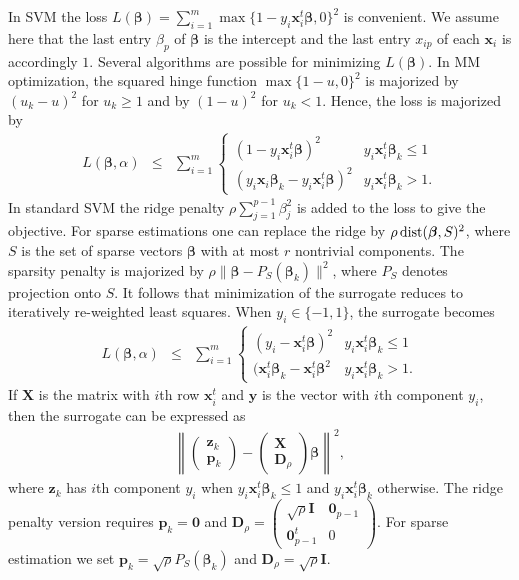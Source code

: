 \documentclass[11pt]{article}
\def\dist{\mathop{\rm dist}\nolimits}
\newcommand{\bzero}{\boldsymbol{0}}
\newcommand{\bp}{\boldsymbol{p}}
\newcommand{\bx}{\boldsymbol{x}}
\newcommand{\by}{\boldsymbol{y}}
\newcommand{\bz}{\boldsymbol{z}}
\newcommand{\bD}{\boldsymbol{D}}
\newcommand{\bI}{\boldsymbol{I}}
\newcommand{\bX}{\boldsymbol{X}}
\newcommand{\bbeta}{\boldsymbol{\beta}}
\begin{document}
In SVM the loss $L(\bbeta)=\sum_{i=1}^m \max\{1-y_i \bx_i^t\bbeta,0\}^2$ is convenient. We assume here that the last entry $\beta_p$ of $\bbeta$ is the intercept and the last entry $x_{ip}$ of each $\bx_i$ is accordingly $1$.  Several algorithms are possible for minimizing $L(\bbeta)$. In MM optimization, the squared hinge function $\max\{1-u,0\}^2$ is majorized by $(u_k-u)^2$ for $u_k \ge 1$ and by $(1-u)^2$ for $u_k < 1$. Hence, the loss is majorized by
\begin{eqnarray*}
L(\bbeta,\alpha) & \le & \sum_{i=1}^m
\begin{cases} (1-y_i \bx_i^t \bbeta)^2 & y_i \bx_i^t \bbeta_k \le 1 \\
(y_i \bx_i\bbeta_k - y_i \bx_i^t \bbeta)^2 & y_i \bx_i^t \bbeta_k > 1 .\end{cases}
\end{eqnarray*} 
In standard SVM the ridge penalty $\rho \sum_{j=1}^{p-1}\beta_j^2$ is added to the loss to give the objective. For sparse estimations one can replace the ridge by 
$\rho\dist(\bbeta,S)^2$, where $S$ is the set of sparse vectors $\bbeta$ with at most $r$ nontrivial components. The sparsity penalty is majorized by $\rho \|\bbeta-P_{S}(\bbeta_k)\|^2$, where $P_{S}$ denotes projection onto $S$. It follows that minimization of the surrogate reduces to iteratively re-weighted least squares. When $y_i \in \{-1,1\}$, the surrogate becomes
\begin{eqnarray*}
L(\bbeta,\alpha) & \le & \sum_{i=1}^m
\begin{cases} (y_i - \bx_i^t \bbeta)^2 & y_i \bx_i^t \bbeta_k \le 1 \\
(\bx_i^t \bbeta_k - \bx_i^t \bbeta^2 & y_i \bx_i^t \bbeta_k > 1 . \end{cases}
\end{eqnarray*}
If $\bX$ is the matrix with $i$th row $\bx_i^t$ and $\by$ is the vector with $i$th component $y_i$, then the surrogate can be expressed as
\begin{eqnarray*}
\left\|\begin{pmatrix}\bz_k \\\bp_{k} \end{pmatrix}-
\begin{pmatrix} \bX \\ \bD_{\rho}\end{pmatrix}\bbeta
\right\|^2,
\end{eqnarray*}
where $\bz_k$ has $i$th component $y_i$ when $y_i \bx_i^t\bbeta_k \le 1$
and $y_i \bx_i^t\bbeta_k$ otherwise. 
The ridge penalty version requires $\bp_{k} = \bzero$ and $\bD_{\rho} = \begin{pmatrix} \sqrt{\rho} \bI & \bzero_{p-1} \\ \bzero_{p-1}^{t} & 0 \end{pmatrix}$.
For sparse estimation we set $\bp_k = \sqrt{\rho} P_S(\bbeta_k)$ and $\bD_{\rho} = \sqrt{\rho} \bI$.
\end{document}

